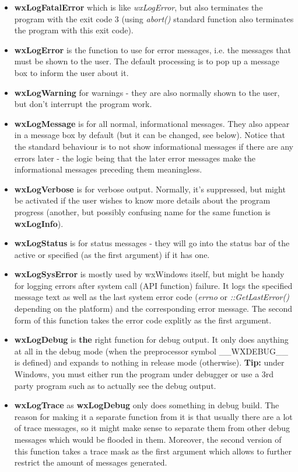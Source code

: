 \begin{itemize}\itemsep=0pt
\item{\bf wxLogFatalError} which is like {\it wxLogError}, but also
terminates the program with the exit code 3 (using {\it abort()} standard
function also terminates the program with this exit code).
\item{\bf wxLogError} is the function to use for error messages, i.e. the
messages that must be shown to the user. The default processing is to pop up a
message box to inform the user about it.
\item{\bf wxLogWarning} for warnings - they are also normally shown to the
user, but don't interrupt the program work.
\item{\bf wxLogMessage} is for all normal, informational messages. They also
appear in a message box by default (but it can be changed, see below). Notice
that the standard behaviour is to not show informational messages if there are
any errors later - the logic being that the later error messages make the
informational messages preceding them meaningless.
\item{\bf wxLogVerbose} is for verbose output. Normally, it's suppressed, but
might be activated if the user wishes to know more details about the program
progress (another, but possibly confusing name for the same function is {\bf
wxLogInfo}).
\item{\bf wxLogStatus} is for status messages - they will go into the status
bar of the active or specified (as the first argument)  if it has one.
\item{\bf wxLogSysError} is mostly used by wxWindows itself, but might be
handy for logging errors after system call (API function) failure. It logs the
specified message text as well as the last system error
code ({\it errno} or {\it ::GetLastError()} depending on the platform) and the corresponding error
message. The second form of this function takes the error code explitly as the
first argument.
\item{\bf wxLogDebug} is {\bf the} right function for debug output. It only
does anything at all in the debug mode (when the preprocessor symbol
\_\_WXDEBUG\_\_ is defined) and expands to nothing in release mode (otherwise).
{\bf Tip:} under Windows, you must either run the program under debugger or
use a 3rd party program such as  
to actually see the debug output.
\item{\bf wxLogTrace} as {\bf wxLogDebug} only does something in debug
build. The reason for making it a separate function from it is that usually
there are a lot of trace messages, so it might make sense to separate them
from other debug messages which would be flooded in them. Moreover, the second
version of this function takes a trace mask as the first argument which allows
to further restrict the amount of messages generated.
\end{itemize}

